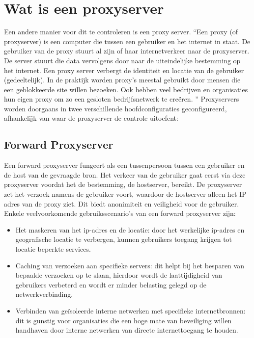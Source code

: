 \section{Wat is een proxyserver}
Een andere manier voor dit te controleren is een proxy server. ``Een proxy (of proxyserver) is een computer die tussen een gebruiker en het internet in staat. De gebruiker van de proxy stuurt al zijn of haar internetverkeer naar de proxyserver. De server stuurt die data vervolgens door naar de uiteindelijke bestemming op het internet. Een proxy server verbergt de identiteit en locatie van de gebruiker (gedeeltelijk). In de praktijk worden proxy’s meestal gebruikt door mensen die een geblokkeerde site willen bezoeken. Ook hebben veel bedrijven en organisaties hun eigen proxy om zo een gesloten bedrijfsnetwerk te creëren. ''\autocite{proxyserver} 
Proxyservers worden doorgaans in twee verschillende hoofdconfiguraties geconfigureerd, afhankelijk van waar de proxyserver de controle uitoefent:  

\subsection{Forward Proxyserver}
Een forward proxyserver fungeert als een tussenpersoon tussen een gebruiker en de host van de gevraagde bron. Het verkeer van de gebruiker gaat eerst via deze proxyserver voordat het de bestemming, de hostserver, bereikt. De proxyserver zet het verzoek namens de gebruiker voort, waardoor de hostserver alleen het IP-adres van de proxy ziet. Dit biedt anonimiteit en veiligheid voor de gebruiker. \newline
Enkele veelvoorkomende gebruiksscenario's van een forward proxyserver zijn:
\begin{itemize}
    \item Het maskeren van het ip-adres en de locatie: door het werkelijke ip-adres en geografische locatie te verbergen, kunnen gebruikers toegang krijgen tot locatie beperkte services.
    \item Caching van verzoeken aan specifieke servers: dit helpt bij het besparen van bepaalde verzoeken op te slaan, hierdoor wordt de laattijdigheid van gebruikers verbeterd en wordt er minder belasting gelegd op de netwerkverbinding.
    \item Verbinden van geïsoleerde interne netwerken met specifieke internetbronnen: dit is gunstig voor organisaties die een hoge mate van beveiliging willen handhaven door interne netwerken van directe internettoegang te houden. \autocite{baeldung-2024}
\end{itemize}

